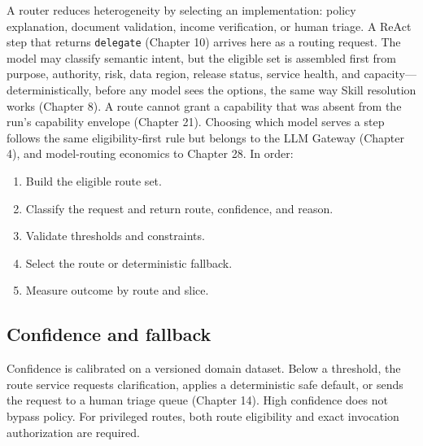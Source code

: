 
A router reduces heterogeneity by selecting an implementation: policy explanation, document validation, income verification, or human triage. A ReAct step that returns \lstinline[style=bookinline]!delegate! (Chapter 10) arrives here as a routing request. The model may classify semantic intent, but the eligible set is assembled first from purpose, authority, risk, data region, release status, service health, and capacity—deterministically, before any model sees the options, the same way Skill resolution works (Chapter 8). A route cannot grant a capability that was absent from the run's capability envelope (Chapter 21). Choosing which model serves a step follows the same eligibility-first rule but belongs to the LLM Gateway (Chapter 4), and model-routing economics to Chapter 28. In order:\par

\begin{enumerate}

\item Build the eligible route set.

\item Classify the request and return route, confidence, and reason.

\item Validate thresholds and constraints.

\item Select the route or deterministic fallback.

\item Measure outcome by route and slice.

\end{enumerate}

\subsection{Confidence and fallback}

Confidence is calibrated on a versioned domain dataset. Below a threshold, the route service requests clarification, applies a deterministic safe default, or sends the request to a human triage queue (Chapter 14). High confidence does not bypass policy. For privileged routes, both route eligibility and exact invocation authorization are required.\par

